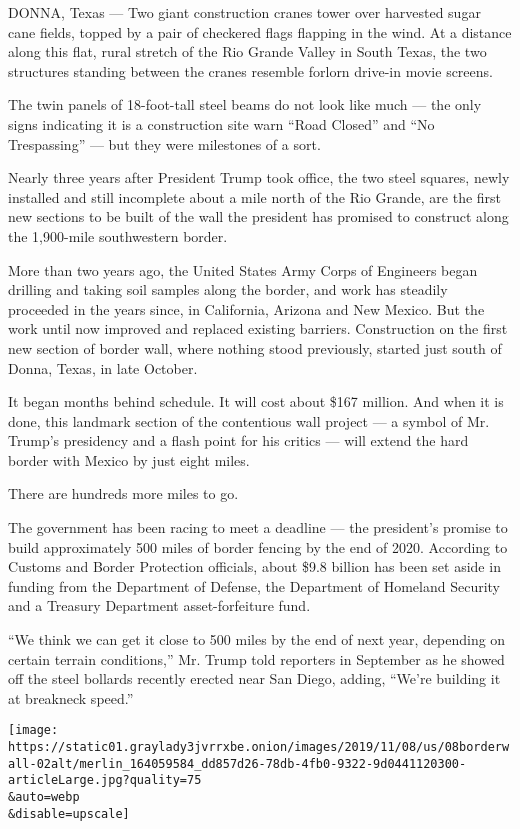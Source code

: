 DONNA, Texas --- Two giant construction cranes tower over harvested
sugar cane fields, topped by a pair of checkered flags flapping in the
wind. At a distance along this flat, rural stretch of the Rio Grande
Valley in South Texas, the two structures standing between the cranes
resemble forlorn drive-in movie screens.

The twin panels of 18-foot-tall steel beams do not look like much ---
the only signs indicating it is a construction site warn ``Road Closed''
and ``No Trespassing'' --- but they were milestones of a sort.

Nearly three years after President Trump took office, the two steel
squares, newly installed and still incomplete about a mile north of the
Rio Grande, are the first new sections to be built of the wall the
president has promised to construct along the 1,900-mile southwestern
border.

More than two years ago, the United States Army Corps of Engineers began
drilling and taking soil samples along the border, and work has steadily
proceeded in the years since, in California, Arizona and New Mexico. But
the work until now improved and replaced existing barriers. Construction
on the first new section of border wall, where nothing stood previously,
started just south of Donna, Texas, in late October.

It began months behind schedule. It will cost about \$167 million. And
when it is done, this landmark section of the contentious wall project
--- a symbol of Mr. Trump's presidency and a flash point for his critics
--- will extend the hard border with Mexico by just eight miles.

There are hundreds more miles to go.

The government has been racing to meet a deadline --- the president's
promise to build approximately 500 miles of border fencing by the end of
2020. According to Customs and Border Protection officials, about \$9.8
billion has been set aside in funding from the Department of Defense,
the Department of Homeland Security and a Treasury Department
asset-forfeiture fund.

``We think we can get it close to 500 miles by the end of next year,
depending on certain terrain conditions,'' Mr. Trump told reporters in
September as he showed off the steel bollards recently erected near San
Diego, adding, ``We're building it at breakneck speed.''

\texttt{[image: https://static01.graylady3jvrrxbe.onion/images/2019/11/08/us/08borderwall-02alt/merlin\_164059584\_dd857d26-78db-4fb0-9322-9d0441120300-articleLarge.jpg?quality=75\\\&auto=webp\\\&disable=upscale]}

